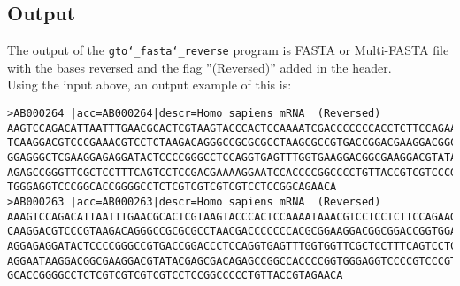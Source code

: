 \subsection*{Output}
The output of the \texttt{gto\char`_fasta\char`_reverse} program is FASTA or Multi-FASTA file with the bases reversed and the flag ''(Reversed)'' added in the header.\\
Using the input above, an output example of this is:
\begin{lstlisting}
>AB000264 |acc=AB000264|descr=Homo sapiens mRNA  (Reversed)
AAGTCCAGACATTAATTTGAACGCACTCGTAAGTACCCACTCCAAAATCGACCCCCCCACCTCTTCCAGAAGGTCTTCT
TCAAGGACGTCCCGAAACGTCCTCTAAGACAGGGCCGCGCGCCTAAGCGCCGTGACCGGACGAAGGACGGCGGACCGGT
GGAGGGCTCGAAGGAGAGGATACTCCCCGGGCCTCCAGGTGAGTTTGGTGAAGGACGGCGAAGGACGTATACGAGCGAC
AGAGCCGGGTTCGCTCCTTTCAGTCCTCCGACGAAAAGGAATCCACCCCGGCCCCTGTTACCGTCGTCCCGTCGCCACC
TGGGAGGTCCCGGCACCGGGGCCTCTCGTCGTCGTCGTCCTCCGGCAGAACA
>AB000263 |acc=AB000263|descr=Homo sapiens mRNA  (Reversed)
AAAGTCCAGACATTAATTTGAACGCACTCGTAAGTACCCACTCCAAAATAAACGTCCTCCTCTTCCAGAAGGTCTTCTT
CAAGGACGTCCCGTAAGACAGGGCCGCGCGCCTAACGACCCCCCCACGCGGAAGGACGGCGGACCGGTGGAGGGCTCGA
AGGAGAGGATACTCCCCGGGCCGTGACCGGACCCTCCAGGTGAGTTTGGTGGTTCGCTCCTTTCAGTCCTCCGACGAAA
AGGAATAAGGACGGCGAAGGACGTATACGAGCGACAGAGCCGGCCACCCCGGTGGGAGGTCCCCGTCCCGTCGCCACCG
GCACCGGGGCCTCTCGTCGTCGTCGTCCTCCGGCCCCCTGTTACCGTAGAACA
\end{lstlisting}